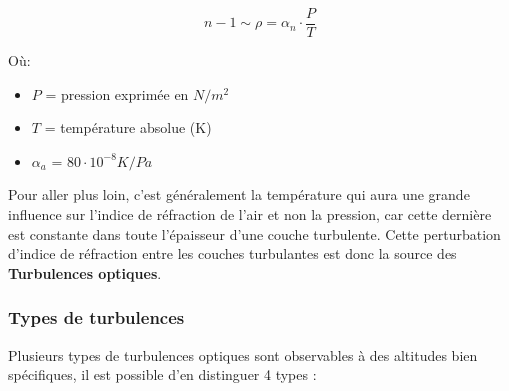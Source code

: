 \begin{equation}
  n-1 \sim \rho = \alpha_n \cdot \frac{P}{T}
\end{equation}

Où:
\begin{itemize}
  \item $P$ = pression exprimée en $N/m^2$
  \item $T$ = température absolue (K)
  \item $\alpha_a$ = $80\cdot10^{-8} K/Pa$
\end{itemize}

Pour aller plus loin, c'est généralement la température qui aura une grande influence sur l'indice de réfraction de l'air
et non la pression, car cette dernière est constante dans toute l'épaisseur d'une couche turbulente. Cette perturbation d'indice de
réfraction entre les couches turbulantes est donc la source des \textbf{Turbulences optiques}\cite{thèse_laurent_turbulence}.

\newpage
\subsubsection{Types de turbulences}
Plusieurs types de turbulences optiques sont observables à des altitudes bien spécifiques,
il est possible d'en distinguer 4 types :

